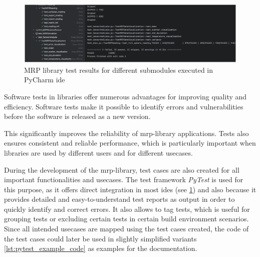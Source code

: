 \begin{figure}
\centering
\includegraphics{./generated_images/border_MRP_library_test_results_for_different_submodules_executed_in_PyCharm_(+ide).png}
\caption{MRP library test results for different submodules executed in
PyCharm \gls{ide}
\label{MRP_library_test_results_for_different_submodules_executed_in_PyCharm_(+ide).png}}
\end{figure}

Software tests in libraries offer numerous advantages for improving
quality and efficiency. Software tests make it possible to identify
errors and vulnerabilities before the software is released as a new
version.

This significantly improves the reliability of \gls{mrp}-library
applications. Tests also ensures consistent and reliable performance,
which is particularly important when libraries are used by different
users and for different usecases.

During the development of the \gls{mrp}-library, test cases are also
created for all important functionalities and usecases. The test
framework \emph{PyTest} \cite{PyTest} is used for this purpose, as
it offers direct integration in most \gls{ide}s (see
\ref{MRP_library_test_results_for_different_submodules_executed_in_PyCharm_(+ide).png})
and also because it provides detailed and easy-to-understand test
reports as output in order to quickly identify and correct errors. It
also allows to tag tests, which is useful for grouping tests or
excluding certain tests in certain build environment scenarios. Since
all intended usecases are mapped using the test cases created, the code
of the test cases could later be used in slightly simplified variants
\ref{lst:pytest_example_code} as examples for the documentation.

